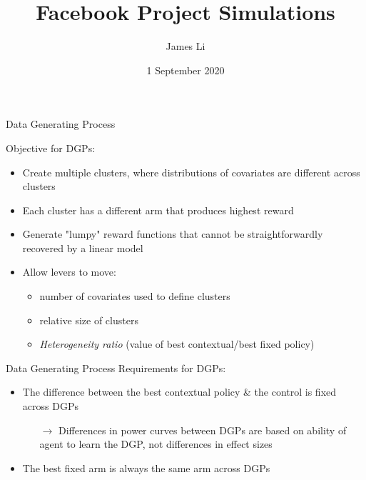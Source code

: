 \documentclass{beamer}
\title{Facebook Project Simulations}
\author{James Li}
\date{1 September 2020}
\begin{document}
\begin{frame}{Data Generating Process}

Objective for DGPs:
\begin{itemize}
    \item Create multiple clusters, where distributions of covariates are different across clusters
    \item Each cluster has a different arm that produces highest reward
    \item Generate "lumpy" reward functions that cannot be straightforwardly recovered by a linear model
    \item Allow levers to move:
    \begin{itemize}
        \item number of covariates used to define clusters
        \item relative size of clusters
        \item \textit{Heterogeneity ratio} (value of best contextual/best fixed policy)
    \end{itemize} 
\end{itemize}
\end{frame}


\begin{frame}{Data Generating Process}
Requirements for DGPs:
\begin{itemize}
    \item The difference between the best contextual policy \& the control is fixed across DGPs
    \begin{itemize}
        \item[$\rightarrow$] Differences in power curves between DGPs are based on ability of agent to learn the DGP, not differences in effect sizes
    \end{itemize}
    \item The best fixed arm is always the same arm across DGPs
\end{itemize}

\end{frame}
\end{document}
